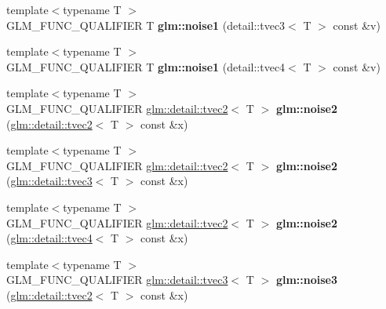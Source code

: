 \begin{DoxyCompactItemize}
\item 
\hypertarget{namespaceglm_a6d0c178ef88d9dbdba8c16d733c2f2a9}{{\footnotesize template$<$typename T $>$ }\\\-G\-L\-M\-\_\-\-F\-U\-N\-C\-\_\-\-Q\-U\-A\-L\-I\-F\-I\-E\-R \-T {\bfseries glm\-::noise1} (detail\-::tvec3$<$ \-T $>$ const \&v)}\label{namespaceglm_a6d0c178ef88d9dbdba8c16d733c2f2a9}

\item 
\hypertarget{namespaceglm_a2266131ab15c73090fd07186ad8bccf4}{{\footnotesize template$<$typename T $>$ }\\\-G\-L\-M\-\_\-\-F\-U\-N\-C\-\_\-\-Q\-U\-A\-L\-I\-F\-I\-E\-R \-T {\bfseries glm\-::noise1} (detail\-::tvec4$<$ \-T $>$ const \&v)}\label{namespaceglm_a2266131ab15c73090fd07186ad8bccf4}

\item 
\hypertarget{namespaceglm_a613ad9c9a0caaca594321e107ffe7b54}{{\footnotesize template$<$typename T $>$ }\\\-G\-L\-M\-\_\-\-F\-U\-N\-C\-\_\-\-Q\-U\-A\-L\-I\-F\-I\-E\-R \*
\hyperlink{structglm_1_1detail_1_1tvec2}{glm\-::detail\-::tvec2}$<$ \-T $>$ {\bfseries glm\-::noise2} (\hyperlink{structglm_1_1detail_1_1tvec2}{glm\-::detail\-::tvec2}$<$ \-T $>$ const \&x)}\label{namespaceglm_a613ad9c9a0caaca594321e107ffe7b54}

\item 
\hypertarget{namespaceglm_a1c398318263d9bd2ae0f5cf12aaa1b28}{{\footnotesize template$<$typename T $>$ }\\\-G\-L\-M\-\_\-\-F\-U\-N\-C\-\_\-\-Q\-U\-A\-L\-I\-F\-I\-E\-R \*
\hyperlink{structglm_1_1detail_1_1tvec2}{glm\-::detail\-::tvec2}$<$ \-T $>$ {\bfseries glm\-::noise2} (\hyperlink{structglm_1_1detail_1_1tvec3}{glm\-::detail\-::tvec3}$<$ \-T $>$ const \&x)}\label{namespaceglm_a1c398318263d9bd2ae0f5cf12aaa1b28}

\item 
\hypertarget{namespaceglm_a1a6474cddee1470476771ba4e087b9e1}{{\footnotesize template$<$typename T $>$ }\\\-G\-L\-M\-\_\-\-F\-U\-N\-C\-\_\-\-Q\-U\-A\-L\-I\-F\-I\-E\-R \*
\hyperlink{structglm_1_1detail_1_1tvec2}{glm\-::detail\-::tvec2}$<$ \-T $>$ {\bfseries glm\-::noise2} (\hyperlink{structglm_1_1detail_1_1tvec4}{glm\-::detail\-::tvec4}$<$ \-T $>$ const \&x)}\label{namespaceglm_a1a6474cddee1470476771ba4e087b9e1}

\item 
\hypertarget{namespaceglm_ae13deb2380745fdaed257f28f0a0833d}{{\footnotesize template$<$typename T $>$ }\\\-G\-L\-M\-\_\-\-F\-U\-N\-C\-\_\-\-Q\-U\-A\-L\-I\-F\-I\-E\-R \*
\hyperlink{structglm_1_1detail_1_1tvec3}{glm\-::detail\-::tvec3}$<$ \-T $>$ {\bfseries glm\-::noise3} (\hyperlink{structglm_1_1detail_1_1tvec2}{glm\-::detail\-::tvec2}$<$ \-T $>$ const \&x)}\label{namespaceglm_ae13deb2380745fdaed257f28f0a0833d}


\end{DoxyCompactItemize}
